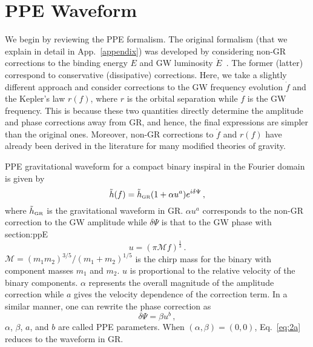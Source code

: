 \documentclass[prd,twocolumn,nofootinbib]{revtex4-1}
\newcommand{\GR}{{\mbox{\tiny GR}}}
\begin{document}
\section{PPE Waveform}\label{section:ppE}
We begin by reviewing the PPE formalism. The original formalism (that we explain in detail in App.~\ref{appendix}) was developed by considering non-GR corrections to the binding energy $E$ and GW luminosity $\dot E$~\cite{Yunes:2009ke,Chatziioannou:2012rf}. The former (latter) correspond to conservative (dissipative) corrections. Here, we take a slightly different approach and consider corrections to the GW frequency evolution $\dot f$ and the Kepler's law $r(f)$, where $r$ is the orbital separation while $f$ is the GW frequency. This is because these two quantities directly determine the amplitude and phase corrections away from GR, and hence, the final expressions are simpler than the original ones. Moreover, non-GR corrections to $\dot f$ and $r(f)$ have already been derived in the literature for many modified theories of gravity.

PPE gravitational waveform for a compact binary inspiral in the Fourier domain is given by~\cite{Yunes:2009ke}
\begin{equation}\label{eq:2a}
\tilde{h}(f)=\tilde{h}_{\GR}(1+\alpha u^a)e^{i\delta\Psi}\,,
\end{equation}
% 
where $\tilde{h}_{\GR}$ is the gravitational waveform in GR. $\alpha u^a$ corresponds to the non-GR correction to the GW amplitude while  $\delta \Psi$ is that to the GW phase with {section:ppE}
\begin{equation}
u=(\pi \mathcal{M} f)^\frac{1}{3}\,.
\end{equation}
$\mathcal{M}=(m_1m_2)^{3/5}/(m_1+m_2)^{1/5}$ is the chirp mass for the binary with component masses $m_1$ and $m_2$. $u$ is proportional to the relative velocity of the binary components. $\alpha$ represents the overall magnitude of the amplitude correction while $a$ gives the velocity dependence of the correction term. In a similar manner, one can rewrite the phase correction as 
\begin{equation}\label{eq:2b}
\delta\Psi=\beta u^b\,,
\end{equation}
$\alpha$, $\beta$, $a$, and $b$ are called PPE parameters. When $(\alpha,\beta) = (0,0)$, Eq.~\eqref{eq:2a} reduces to the waveform in GR.

\end{document}
